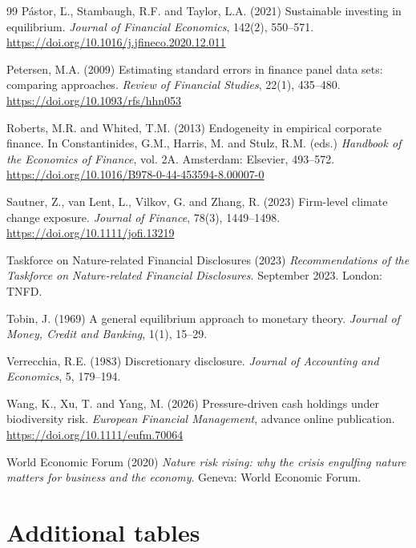 \documentclass[12pt,a4paper]{article}
\begin{document}
\begin{thebibliography}{99}
 P\'astor, \v{L}., Stambaugh, R.F. and Taylor, L.A. (2021) Sustainable investing in equilibrium. \emph{Journal of Financial Economics}, 142(2), 550--571. \url{https://doi.org/10.1016/j.jfineco.2020.12.011}

 Petersen, M.A. (2009) Estimating standard errors in finance panel data sets: comparing approaches. \emph{Review of Financial Studies}, 22(1), 435--480. \url{https://doi.org/10.1093/rfs/hhn053}

 Roberts, M.R. and Whited, T.M. (2013) Endogeneity in empirical corporate finance. In Constantinides, G.M., Harris, M. and Stulz, R.M. (eds.) \emph{Handbook of the Economics of Finance}, vol. 2A. Amsterdam: Elsevier, 493--572. \url{https://doi.org/10.1016/B978-0-44-453594-8.00007-0}

 Sautner, Z., van Lent, L., Vilkov, G. and Zhang, R. (2023) Firm-level climate change exposure. \emph{Journal of Finance}, 78(3), 1449--1498. \url{https://doi.org/10.1111/jofi.13219}

 Taskforce on Nature-related Financial Disclosures (2023) \emph{Recommendations of the Taskforce on Nature-related Financial Disclosures}. September 2023. London: TNFD.

 Tobin, J. (1969) A general equilibrium approach to monetary theory. \emph{Journal of Money, Credit and Banking}, 1(1), 15--29.

 Verrecchia, R.E. (1983) Discretionary disclosure. \emph{Journal of Accounting and Economics}, 5, 179--194.

 Wang, K., Xu, T. and Yang, M. (2026) Pressure-driven cash holdings under biodiversity risk. \emph{European Financial Management}, advance online publication. \url{https://doi.org/10.1111/eufm.70064}

 World Economic Forum (2020) \emph{Nature risk rising: why the crisis engulfing nature matters for business and the economy}. Geneva: World Economic Forum.

\end{thebibliography}

\appendix
\renewcommand{\thetable}{A\arabic{table}}
\setcounter{table}{0}
\section{Additional tables}
\end{document}
